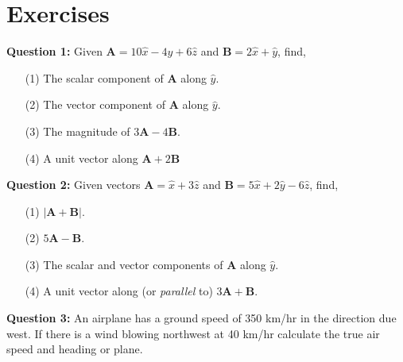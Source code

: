 \documentclass[12pt,a4paper]{article}
\begin{document}
\section{Exercises}
\noindent\textbf{Question 1:} Given $\textbf{A}=10\hat x-4\hat y+6\hat z$ and $\textbf{B}=2\hat x+\hat y$, find,
\begin{enumerate}
\item[(1)] The scalar component of \textbf{A} along $\hat y$.
\item[(2)] The vector component of \textbf{A} along $\hat y$.
\item[(3)] The magnitude of $3\textbf{A}-4\textbf{B}$.
\item[(4)] A unit vector along $\textbf{A}+2\textbf{B}$
\end{enumerate}
\noindent\textbf{Question 2:} Given vectors $\textbf{A}=\hat x+3\hat z$ and $\textbf{B}=5\hat x+2\hat y-6\hat z$, find,
\begin{enumerate}
\item[(1)] $|\textbf{A}+\textbf{B}|$.
\item[(2)] $5\textbf{A}-\textbf{B}$.
\item[(3)] The scalar and vector components of \textbf{A} along $\hat y$.
\item[(4)] A unit vector along (or \textit{parallel} to) $3\textbf{A}+\textbf{B}$.
\end{enumerate}
\noindent\textbf{Question 3:} An airplane has a ground speed of 350 km/hr in the direction due west. If there is a wind blowing northwest at 40 km/hr calculate the true air speed and heading or plane.


\end{document}
